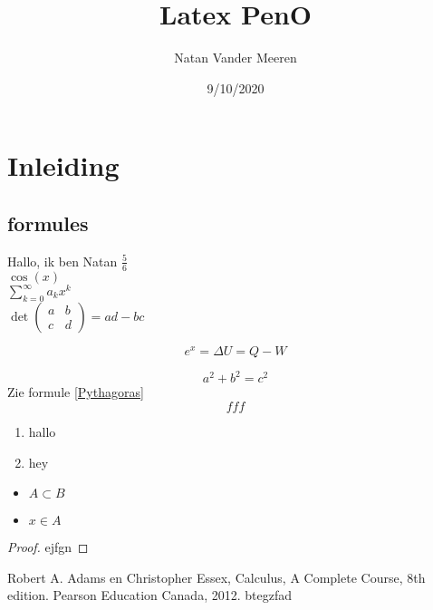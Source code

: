 \documentclass[a4paper,11pt]{article}
\title{Latex PenO}
\author{Natan Vander Meeren}
\date{9/10/2020}
\begin{document}
	\maketitle
	\section{Inleiding}

	\subsection{formules}
	Hallo, ik ben Natan $\frac{5}{6}$	\\
	
	$\cos(x)$	\\
	
	$\sum_{k=0}^\infty a_kx^k$	\\
	
	$\det
	\begin{pmatrix}
	a & b \\
	c & d
	\end{pmatrix}
	= ad - bc
	$
	
	\begin{equation} \label{formule1}
		e^x = \Delta U = Q - W
	\end{equation}
	
	\begin{equation*}\label{Pythagoras}
		a^2+b^2=c^2
	\end{equation*}
	Zie formule \ref{Pythagoras}
	\begin{equation}
		fff
	\end{equation}
	

	\begin{enumerate}
		\item hallo
		\item hey
	\end{enumerate}
	
	
	\begin{itemize}
		\item $A \subset B$
		\item $x \in A$
	\end{itemize}
	
	
	\begin{proof}
		ejfgn
	\end{proof}
	
	
	\cite{referentie1}
	
	
	\begin{thebibliography}{5}
		 Robert A. Adams en Christopher Essex, Calculus, A Complete Course, 8th edition. Pearson Education Canada, 2012.
		 btegzfad
	\end{thebibliography}
	
\end{document}
